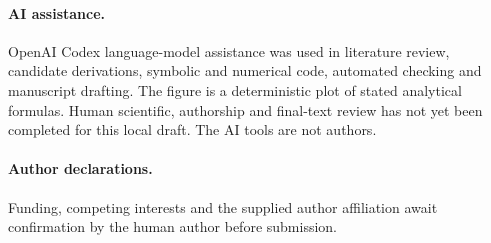 \documentclass[11pt,a4paper]{article}
\begin{document}
\paragraph{AI assistance.}
OpenAI Codex language-model assistance was used in literature review, candidate derivations, symbolic and numerical code, automated checking and manuscript drafting. The figure is a deterministic plot of stated analytical formulas. Human scientific, authorship and final-text review has not yet been completed for this local draft. The AI tools are not authors.

\paragraph{Author declarations.}
Funding, competing interests and the supplied author affiliation await confirmation by the human author before submission.



\end{document}
